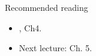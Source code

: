 \begin{frame}{Recommended reading}
\begin{itemize}
  \item[\faBook] \cite{Robert2007}, Ch4.
 \item[\faForward] Next lecture: \cite{Robert2007} Ch. 5.
 \end{itemize} 
\end{frame}
